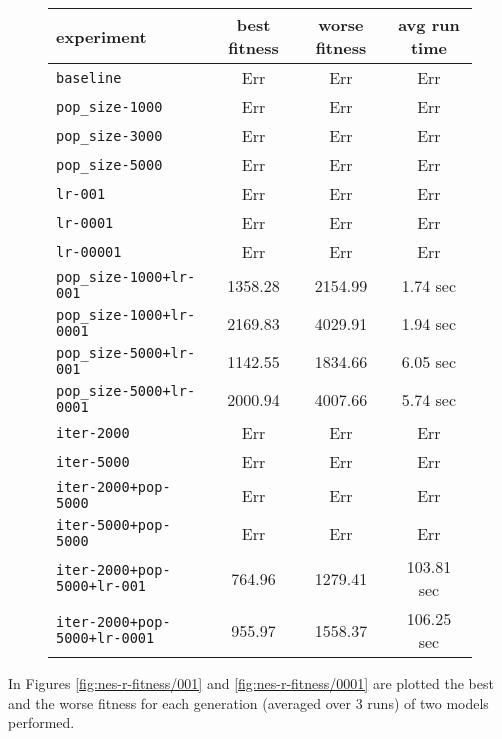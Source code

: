 \begin{figure}[htb]
	\centering
	
	\begin{tabular}{lccc}
		\toprule
		\textbf{experiment} & \textbf{best fitness} & \textbf{worse fitness} & \textbf{avg run time} \\
		\midrule
		\texttt{baseline 						} &	   Err &	    Err &	       Err \\
		\texttt{pop\_size-1000 					}    &	   Err &	    Err &	       Err \\
		\texttt{pop\_size-3000 					}    &	   Err &	    Err &	       Err \\
		\texttt{pop\_size-5000 					}    &	   Err &	    Err &	       Err \\
		\texttt{lr-001 							}   &	   Err &	    Err &	       Err \\
		\texttt{lr-0001	 						}  &	   Err &	    Err &	       Err \\
		\texttt{lr-00001	 					} &	   Err &	    Err &	       Err \\
		\texttt{pop\_size-1000+lr-001 			} &              1358.28 &	2154.99 &	  1.74 sec \\
		\texttt{pop\_size-1000+lr-0001 			} &              2169.83 &	4029.91 &	  1.94 sec \\
		\texttt{pop\_size-5000+lr-001 			} &              1142.55 &	1834.66 &	  6.05 sec \\
		\texttt{pop\_size-5000+lr-0001 			} &              2000.94 &	4007.66 &	  5.74 sec \\
		\texttt{iter-2000 						}  &	   Err &	    Err &	       Err \\
		\texttt{iter-5000 						}  &	   Err &	    Err &	       Err \\
		\texttt{iter-2000+pop-5000 	}			  &	   Err &	    Err &	       Err \\
		\texttt{iter-5000+pop-5000 	}			  &	   Err &	    Err &	       Err \\
		\texttt{iter-2000+pop-5000+lr-001 }		  &	764.96 &	1279.41 &	103.81 sec \\
		\texttt{iter-2000+pop-5000+lr-0001 }	  &	955.97 &	1558.37 &	106.25 sec \\
		\bottomrule
	\end{tabular}
	\label{tab:nes-performance-r}
\end{figure}

In Figures \ref{fig:nes-r-fitness/001} and \ref{fig:nes-r-fitness/0001} are plotted the best and the worse fitness for each generation (averaged over 3 runs) of two models performed.

